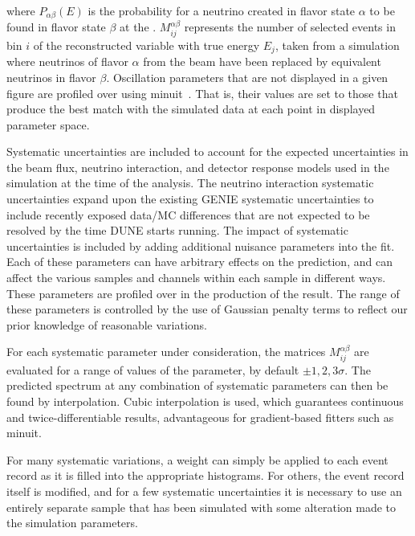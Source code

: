 where $P_{\alpha\beta}(E)$ is the probability for a neutrino created in flavor state $\alpha$ to be found in flavor state $\beta$ at the . $M_{ij}^{\alpha\beta}$ represents the number of selected events in bin $i$ of the reconstructed variable with true energy $E_j$, taken from a simulation where neutrinos of flavor $\alpha$ from the beam have been replaced by equivalent neutrinos in flavor $\beta$. Oscillation parameters that are not displayed in a given figure are profiled over using {\sc minuit}~\cite{James:1994vla}. That is, their values are set to those that produce the best match with the simulated data at each point in displayed parameter space.

Systematic uncertainties are included to account for the expected uncertainties in the beam flux, neutrino interaction, and detector response models used in the simulation at the time of the analysis. The neutrino interaction systematic uncertainties expand upon the existing GENIE systematic uncertainties to include recently exposed data/MC differences that are not expected to be resolved by the time DUNE starts running. The impact of systematic uncertainties is included by adding additional nuisance parameters into the fit. Each of these parameters can have arbitrary effects on the  prediction, and can affect the various samples and channels within each sample in different ways. These parameters are profiled over in the production of the result. The range of these parameters is controlled by the use of Gaussian penalty terms to reflect our prior knowledge of reasonable variations.

For each systematic parameter under consideration, the matrices $M_{ij}^{\alpha\beta}$ are evaluated for a range of values of the parameter, by default $\pm1,2,3\sigma$. The predicted spectrum at any combination of systematic parameters can then be found by interpolation. Cubic interpolation is used, which guarantees continuous and twice-differentiable results, advantageous for gradient-based fitters such as {\sc minuit}. %

For many systematic variations, a weight can simply be applied to each event record as it is filled into the appropriate histograms. For others, the event record itself is modified, and for a few systematic uncertainties it is necessary to use an entirely separate sample that has been simulated with some alteration made to the simulation parameters. %








